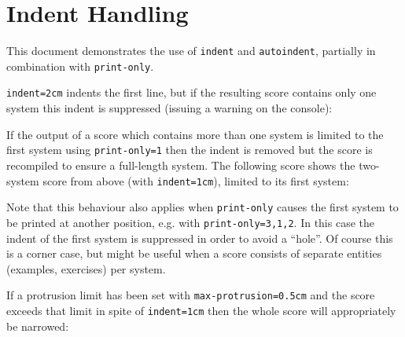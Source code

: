 \documentclass{scrartcl}
\begin{document}
\section*{Indent Handling}

This document demonstrates the use of \texttt{indent} and \texttt{autoindent},
partially in combination with \texttt{print-only}.

\texttt{indent=2cm} indents the first line, but if the resulting score contains
only one system this indent is suppressed (issuing a warning on the console):



If the output of a score which contains more than one system is limited to the
first system using \texttt{print-only=1} then the indent is removed but the
score is recompiled to ensure a full-length system. The following score shows
the two-system score from above (with \texttt{indent=1cm}), limited to its first
system:


Note that this behaviour also applies when \texttt{print-only} causes the first
system to be printed at another position, e.g. with \texttt{print-only={3,1,2}}.
In this case the indent of the first system is suppressed in order to avoid a
“hole”. Of course this is a corner case, but might be useful when a score
consists of separate entities (examples, exercises) per system.


If a protrusion limit has been set with \texttt{max-protrusion=0.5cm} and the
score exceeds that limit in spite of \texttt{indent=1cm} then the whole score
will appropriately be narrowed:

\end{document}

